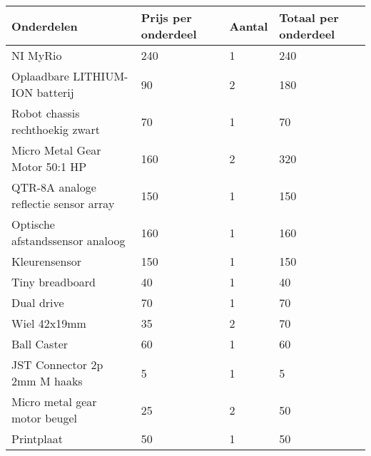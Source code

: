 \documentclass[a4paper,kulak]{kulakarticle} %
\begin{document}
	\begin{tabular}{|l|l|l|l|}
		\hline
		\textbf{Onderdelen}                   & \textbf{Prijs per onderdeel} & \textbf{Aantal} & \textbf{Totaal per onderdeel} \\ \hline
		NI MyRio                              & 240                          & 1               & 240                           \\ \hline
		Oplaadbare LITHIUM-ION batterij       & 90                           & 2               & 180                           \\ \hline
		Robot chassis rechthoekig zwart       & 70                           & 1               & 70                            \\ \hline
		Micro Metal Gear Motor 50:1 HP        & 160                          & 2               & 320                           \\ \hline
		QTR-8A analoge reflectie sensor array & 150                          & 1               & 150                           \\ \hline
		Optische afstandssensor analoog       & 160                          & 1               & 160                           \\ \hline
		Kleurensensor                         & 150                          & 1               & 150                           \\ \hline
		Tiny breadboard                       & 40                           & 1               & 40                            \\ \hline
		Dual drive                            & 70                           & 1               & 70                            \\ \hline
		Wiel 42x19mm                          & 35                           & 2               & 70                            \\ \hline
		Ball Caster                           & 60                           & 1               & 60                            \\ \hline
		JST Connector 2p 2mm M haaks          & 5                            & 1               & 5                             \\ \hline
		Micro metal gear motor beugel         & 25                           & 2               & 50                            \\ \hline
		Printplaat                            & 50                           & 1               & 50                            \\ \hline
	\end{tabular}
\end{document}
